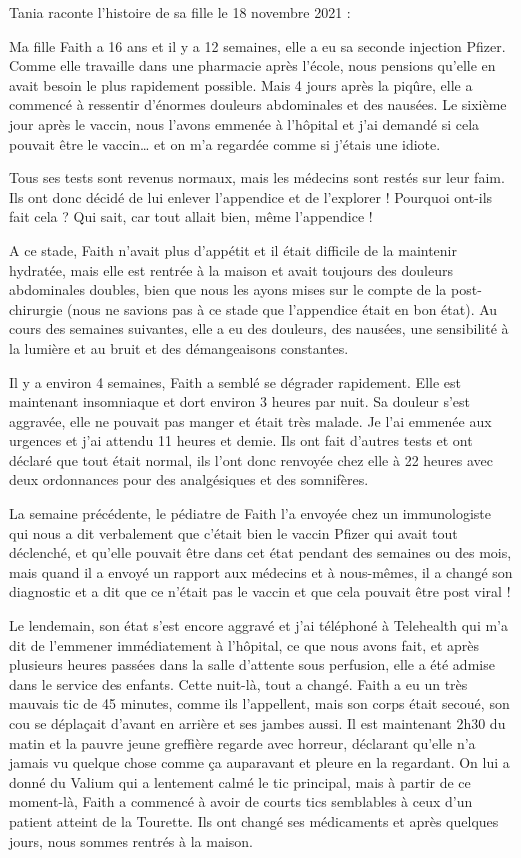 Tania raconte l'histoire de sa fille le 18 novembre 2021 :

Ma fille Faith a 16 ans et il y a 12 semaines, elle a eu sa seconde injection
Pfizer. Comme elle travaille dans une pharmacie après l'école, nous pensions
qu'elle en avait besoin le plus rapidement possible. Mais 4 jours après la
piqûre, elle a commencé à ressentir d'énormes douleurs abdominales et des
nausées. Le sixième jour après le vaccin, nous l'avons emmenée à l'hôpital et
j'ai demandé si cela pouvait être le vaccin… et on m'a regardée comme si j'étais
une idiote.

Tous ses tests sont revenus normaux, mais les médecins sont restés sur leur
faim. Ils ont donc décidé de lui enlever l'appendice et de l'explorer ! Pourquoi
ont-ils fait cela ? Qui sait, car tout allait bien, même l'appendice !

A ce stade, Faith n'avait plus d'appétit et il était difficile de la maintenir
hydratée, mais elle est rentrée à la maison et avait toujours des douleurs
abdominales doubles, bien que nous les ayons mises sur le compte de la
post-chirurgie (nous ne savions pas à ce stade que l'appendice était en bon
état). Au cours des semaines suivantes, elle a eu des douleurs, des nausées, une
sensibilité à la lumière et au bruit et des démangeaisons constantes.

Il y a environ 4 semaines, Faith a semblé se dégrader rapidement. Elle est
maintenant insomniaque et dort environ 3 heures par nuit. Sa douleur s'est
aggravée, elle ne pouvait pas manger et était très malade. Je l'ai emmenée aux
urgences et j'ai attendu 11 heures et demie. Ils ont fait d'autres tests et ont
déclaré que tout était normal, ils l'ont donc renvoyée chez elle à 22 heures
avec deux ordonnances pour des analgésiques et des somnifères.

La semaine précédente, le pédiatre de Faith l'a envoyée chez un immunologiste
qui nous a dit verbalement que c'était bien le vaccin Pfizer qui avait tout
déclenché, et qu'elle pouvait être dans cet état pendant des semaines ou des
mois, mais quand il a envoyé un rapport aux médecins et à nous-mêmes, il a
changé son diagnostic et a dit que ce n'était pas le vaccin et que cela pouvait
être post viral !

Le lendemain, son état s'est encore aggravé et j'ai téléphoné à Telehealth qui
m'a dit de l'emmener immédiatement à l'hôpital, ce que nous avons fait, et après
plusieurs heures passées dans la salle d'attente sous perfusion, elle a été
admise dans le service des enfants. Cette nuit-là, tout a changé. Faith a eu un
très mauvais tic de 45 minutes, comme ils l'appellent, mais son corps était
secoué, son cou se déplaçait d'avant en arrière et ses jambes aussi. Il est
maintenant 2h30 du matin et la pauvre jeune greffière regarde avec horreur,
déclarant qu'elle n'a jamais vu quelque chose comme ça auparavant et pleure en
la regardant. On lui a donné du Valium qui a lentement calmé le tic principal,
mais à partir de ce moment-là, Faith a commencé à avoir de courts tics
semblables à ceux d'un patient atteint de la Tourette. Ils ont changé ses
médicaments et après quelques jours, nous sommes rentrés à la maison.

